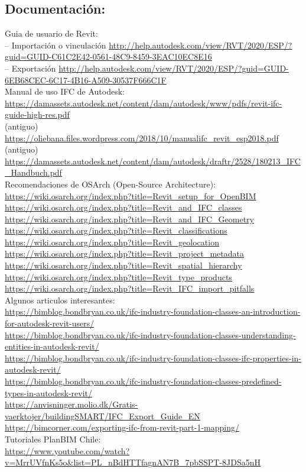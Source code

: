 \documentclass[spanish,12pt,a4paper,final,oneside]{book}
\begin{document}
\subsection*{Documentación:}
Guia de usuario de Revit:
\\-- Importación o vinculación \url{http://help.autodesk.com/view/RVT/2020/ESP/?guid=GUID-C61C2E42-0561-48C9-8459-3EAC10EC8E16}
\\-- Exportación \url{http://help.autodesk.com/view/RVT/2020/ESP/?guid=GUID-6EB68CEC-6C17-4B16-A509-30537F666C1F}
\\Manual de uso IFC de Autodesk:
\\ \url{https://damassets.autodesk.net/content/dam/autodesk/www/pdfs/revit-ifc-guide-high-res.pdf}
\\(antiguo) \url{https://oliebana.files.wordpress.com/2018/10/manualifc_revit_esp2018.pdf}
\\(antiguo) \url{https://damassets.autodesk.net/content/dam/autodesk/draftr/2528/180213_IFC_Handbuch.pdf}
\\Recomendaciones de OSArch (Open-Source Architecture):
\\ \url{https://wiki.osarch.org/index.php?title=Revit_setup_for_OpenBIM}
\\ \url{https://wiki.osarch.org/index.php?title=Revit_and_IFC_classes}
\\ \url{https://wiki.osarch.org/index.php?title=Revit_and_IFC_Geometry}
\\ \url{https://wiki.osarch.org/index.php?title=Revit_classifications}
\\ \url{https://wiki.osarch.org/index.php?title=Revit_geolocation}
\\ \url{https://wiki.osarch.org/index.php?title=Revit_project_metadata}
\\ \url{https://wiki.osarch.org/index.php?title=Revit_spatial_hierarchy}
\\ \url{https://wiki.osarch.org/index.php?title=Revit_type_products}
\\ \url{https://wiki.osarch.org/index.php?title=Revit_IFC_import_pitfalls}
\\Algunos articulos interesantes:
\\ \url{https://bimblog.bondbryan.co.uk/ifc-industry-foundation-classes-an-introduction-for-autodesk-revit-users/}
\\ \url{https://bimblog.bondbryan.co.uk/ifc-industry-foundation-classes-understanding-entities-in-autodesk-revit/}
\\ \url{https://bimblog.bondbryan.co.uk/ifc-industry-foundation-classes-ifc-properties-in-autodesk-revit/}
\\ \url{https://bimblog.bondbryan.co.uk/ifc-industry-foundation-classes-predefined-types-in-autodesk-revit/}
\\ \url{https://anvisninger.molio.dk/Gratis-vaerktojer/buildingSMART/IFC_Export_Guide_EN}
\\ \url{https://bimcorner.com/exporting-ifc-from-revit-part-1-mapping/}
\\Tutoriales PlanBIM Chile: \\ \url{https://www.youtube.com/watch?v=MrrUVfnKs5o&list=PL_nBdHTTfagnAN7B_7pbSSPT-8JDSa5nH}
\end{document}
